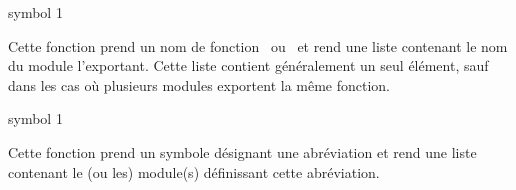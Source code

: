  {symbol} {1}

Cette fonction prend un nom de fonction \LeLisp\ ou \Aida\ et rend une
liste contenant le nom du module l'exportant.  Cette liste contient
g\'{e}n\'{e}ralement un seul \'{e}l\'{e}ment, sauf dans les cas o\`{u} plusieurs
modules exportent la m\^{e}me fonction.

 {symbol} {1}

Cette fonction prend un symbole d\'{e}signant une abr\'{e}viation et rend
une liste contenant le (ou les) module(s) d\'{e}finissant cette
abr\'{e}viation.
